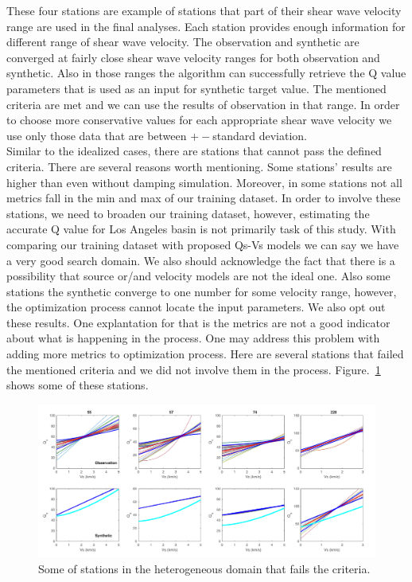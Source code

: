 These four stations are example of stations that part of their shear wave velocity range are used in the final analyses. Each station provides enough information for different range of shear wave velocity. The observation and synthetic are converged at fairly close shear wave velocity ranges for both observation and synthetic. Also in those ranges the algorithm can successfully retrieve the Q value parameters that is used as an input for synthetic target value. The mentioned criteria are met and we can use the results of observation in that range. In order to choose more conservative values for each appropriate shear wave velocity we use only those data that are between $+-$standard deviation.\\
 Similar to the idealized cases, there are stations that cannot pass the defined criteria. There are several reasons worth mentioning. Some stations' results are higher than even without damping simulation. Moreover, in some stations not all metrics fall in the min and max of our training dataset. In order to involve these stations, we need to broaden our training dataset, however, estimating the accurate Q value for Los Angeles basin is not primarily task of this study. With comparing our training dataset with proposed Qs-Vs models we can say we have a very good search domain. We also should acknowledge the fact that there is a possibility that source or/and velocity models are not the ideal one. Also some stations the synthetic converge to one number for some velocity range, however, the optimization process cannot locate the input parameters. We also opt out these results. One explantation for that is the metrics are not a good indicator about what is happening in the process. One may address this problem with adding more metrics to optimization process. Here are several stations that failed the mentioned criteria and we did not involve them in the process. Figure.~\ref{fig:unused_stations_example} shows some of these stations. 

  \begin{figure}[ht]
    \centering
    \includegraphics[width=\textwidth]{figures/pdf/unused_stations_example.pdf}
    \caption{Some of stations in the heterogeneous domain that fails the criteria. }
    \label{fig:unused_stations_example}
\end{figure}

